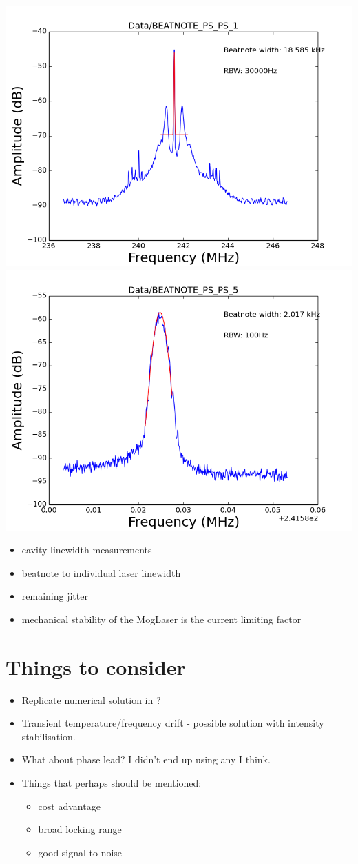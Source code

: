 \documentclass{article}
\newenvironment{Figure}
  {\par\medskip\noindent\minipage{\linewidth}}
  {\endminipage\par\medskip}
\begin{document}
\begin{multicols}{2}
\begin{Figure}
    \centering
    \includegraphics[width=0.49\linewidth]{Figs/beatnote_wide.png}
    \includegraphics[width=0.49\linewidth]{Figs/beatnote_zoom.png}
    \captionsetup{type=figure}
    \label{beatnote}
\end{Figure}

\begin{itemize}
\item cavity linewidth measurements
\item beatnote to individual laser linewidth
\item remaining jitter
\item mechanical stability of the MogLaser is the current limiting factor
\end{itemize}

\section{Things to consider}
\begin{itemize}
\item Replicate numerical solution in \cite{harris_polarization_2006}?
\item Transient temperature/frequency drift - possible solution with intensity stabilisation.
\item What about phase lead? I didn't end up using any I think.
\item Things that perhaps should be mentioned:
    \begin{itemize}
    \item cost advantage
    \item broad locking range
    \item good signal to noise
    \end{itemize}
\end{itemize}


\end{multicols}
\end{document}
